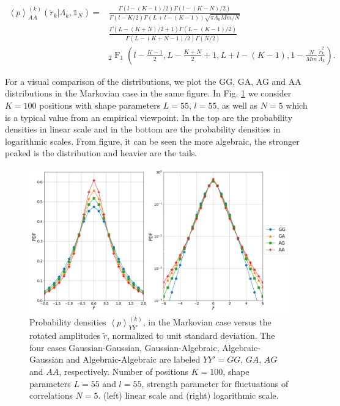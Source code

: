 \begin{equation}
    \begin{split}
    \left\langle p \right\rangle_{AA}^{\left(k\right)}
    \left(\tilde{r}_{k} \vert \Lambda_{k}, \mathbb{1}_{N}\right) =
    &\frac{\Gamma\left(l - \left(K - 1 \right) / 2\right)
    \Gamma\left(l - \left(K - N\right) / 2\right)}
    {\Gamma\left(l - K/ 2\right) \Gamma\left(L + l - \left(K - 1\right) \right)
    \sqrt{\pi \Lambda_{k}Mm/N}} \\
    &\frac{\Gamma\left(L - \left(K + N \right) / 2 + 1\right)
    \Gamma\left(L - \left(K - 1\right) / 2\right)}
    {\Gamma\left(L - \left(K + N - 1\right) / 2\right) \Gamma\left(N / 2\right)
    } \\
    & _{2}\operatorname{F}_{1} \left(l - \frac{K - 1}{2}, L -\frac{K + N}{2}+1,
    L + l - \left(K - 1\right), 1 - \frac{N}{Mm} \frac{\tilde{r}^{2}_{k}}
    {\Lambda_{k}}\right).
    \end{split}
\end{equation}

For a visual comparison of the distributions, we plot the GG, GA, AG and AA
distributions in the Markovian case in the same figure. In Fig.
\ref{fig:distributions_comparison} we consider $K = 100$ positions with shape
parameters $L = 55$, $l = 55$, as well as $N = 5$ which is a typical value from
an empirical viewpoint. In the top are the probability densities in linear
scale and in the bottom are the probability densities in logarithmic scales.
From figure, it can be seen the more algebraic, the stronger peaked is the
distribution and heavier are the tails.

\begin{figure}[htbp]
    \centering
    \includegraphics[width=0.9\columnwidth]
    {figures/07_distributions_comparison.png}
    \caption{Probability densities
             $\left\langle p \right\rangle_{YY'}^{\left(k\right)}$, in the
             Markovian case versus the rotated amplitudes $\tilde{r}$,
             normalized to unit standard deviation. The four cases
             Gaussian-Gaussian, Gaussian-Algebraic, Algebraic-Gaussian and
             Algebraic-Algebraic are labeled $YY' = GG$, $GA$, $AG$ and $AA$,
             respectively. Number of positions $K = 100$, shape parameters
             $L = 55$ and $l = 55$, strength parameter for fluctuations of
             correlations $N = 5$. (left) linear scale and (right) logarithmic
             scale.}
    \label{fig:distributions_comparison}
\end{figure}

